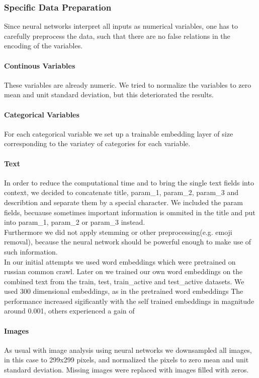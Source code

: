 \documentclass[runningheads]{llncs}
\begin{document}
 \subsubsection{Specific Data Preparation}
 Since neural networks interpret all inputs as numerical variables, one has to carefully preprocess the data, such that there are no false relations in the encoding of the variables.
 \paragraph{Continous Variables} These variables are already numeric. We tried to normalize the variables to zero mean and unit standard deviation, but this deteriorated the results. %
 \paragraph{Categorical Variables} For each categorical variable we set up a trainable embedding layer of size corresponding to the variatey of categories for each variable. %
 \paragraph{Text} In order to reduce the computational time and to bring the single text fields into context, we decided to concatenate title, param\_1, param\_2, param\_3 and  describtion and separate them by a special character. We included the param fields, becuause sometimes important information is ommited in the title and put into param\_1, param\_2 or param\_3 instead.\\
 Furthermore we did not apply stemming or other preprocessing(e.g. emoji removal), because the neural network should be powerful enough to make use of such information.\\
 In our initial attempts we used word embeddings which were pretrained on russian common crawl. Later on we trained our own word embeddings on the combined text from the train, test, train\_active and test\_active datasets. We used 300 dimensional embeddings, as in the pretrained word embeddings %
 The performance increased sigificantly with the self trained embeddings in magnitude around 0.001, others experienced a gain of %
 
 \paragraph{Images} As usual with image analysis using neural networks we downsampled all images, in this case to 299x299 pixels, and normalized the pixels to zero mean and unit standard deviation. Missing images were replaced with images filled with zeros.
\end{document}
